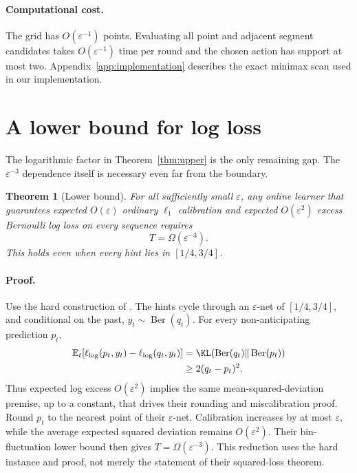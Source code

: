 \documentclass{article}
\newtheorem{theorem}{Theorem}
\newcommand{\Ber}{\operatorname{Ber}}
\begin{document}
\paragraph{Computational cost.}
The grid has $O(\varepsilon^{-1})$ points. Evaluating all point and adjacent segment candidates takes $O(\varepsilon^{-1})$ time per round and the chosen action has support at most two. Appendix~\ref{app:implementation} describes the exact minimax scan used in our implementation.

\section{A lower bound for log loss}
\label{sec:lower}

The logarithmic factor in Theorem~\ref{thm:upper} is the only remaining gap. The $\varepsilon^{-3}$ dependence itself is necessary even far from the boundary.

\begin{theorem}[Lower bound]
\label{thm:lower}
For all sufficiently small $\varepsilon$, any online learner that guarantees expected $O(\varepsilon)$ ordinary $\ell_1$ calibration and expected $O(\varepsilon^2)$ excess Bernoulli log loss on every sequence requires
\begin{equation}
 T=\Omega(\varepsilon^{-3}).
 \label{eq:lower-rate}
\end{equation}
This holds even when every hint lies in $[1/4,3/4]$.
\end{theorem}

\paragraph{Proof.}
Use the hard construction of \citet{hu2026optimal}. The hints cycle through an $\varepsilon$-net of $[1/4,3/4]$, and conditional on the past, $y_t\sim\Ber(q_t)$. For every non-anticipating prediction $p_t$,
\begin{align}
 \mathbb{E}_t[
 \ell_{\log}(p_t,y_t)-\ell_{\log}(q_t,y_t)]
 &=\KL(\Ber(q_t)\Vert\Ber(p_t))\nonumber\\
 &\geq2(q_t-p_t)^2.
 \label{eq:pinsker}
\end{align}
Thus expected log excess $O(\varepsilon^2)$ implies the same mean-squared-deviation premise, up to a constant, that drives their rounding and miscalibration proof. Round $p_t$ to the nearest point of their $\varepsilon$-net. Calibration increases by at most $\varepsilon$, while the average expected squared deviation remains $O(\varepsilon^2)$. Their bin-fluctuation lower bound then gives $T=\Omega(\varepsilon^{-3})$. This reduction uses the hard instance and proof, not merely the statement of their squared-loss theorem.
\end{document}
